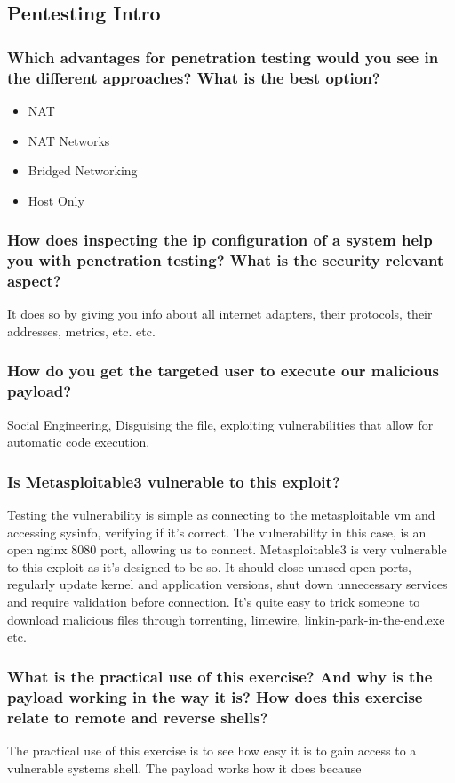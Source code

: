 \subsection{Pentesting Intro}
\subsubsection{Which advantages for penetration testing would you see in the different approaches? What is the best option?}

\begin{itemize}
    \item NAT
    \item NAT Networks
    \item Bridged Networking
    \item Host Only
\end{itemize}

\subsubsection{How does inspecting the ip configuration of a system help you with penetration testing? What is the security relevant aspect?}
It does so by giving you info about all internet adapters, their protocols, their addresses, metrics, etc. etc.

\subsubsection{How do you get the targeted user to execute our malicious payload?}
Social Engineering, Disguising the file, exploiting vulnerabilities that allow for automatic code execution.

\subsubsection{Is Metasploitable3 vulnerable to this exploit?}
Testing the vulnerability is simple as connecting to the metasploitable vm and accessing sysinfo, verifying if it's correct.
The vulnerability in this case, is an open nginx 8080 port, allowing us to connect.
Metasploitable3 is very vulnerable to this exploit as it's designed to be so.
It should close unused open ports, regularly update kernel and application versions, shut down unnecessary services and require validation before connection.
It's quite easy to trick someone to download malicious files through torrenting, limewire, linkin-park-in-the-end.exe etc.

\subsubsection{What is the practical use of this exercise? And why is the payload working in the way it is? How does this exercise relate to remote and reverse shells?}
The practical use of this exercise is to see how easy it is to gain access to a vulnerable systems shell. The payload works how it does because

